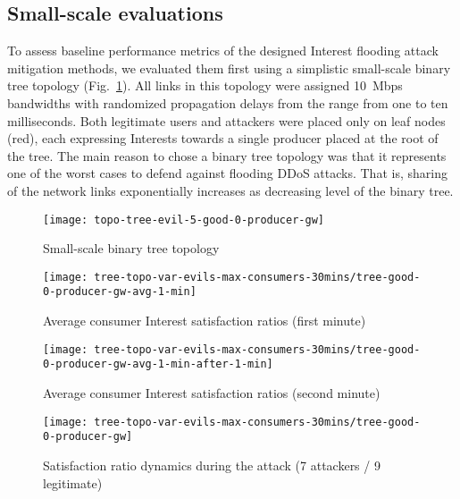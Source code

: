 \subsection{Small-scale evaluations}
\label{sec:small-scale}

To assess baseline performance metrics of the designed Interest flooding attack mitigation methods, we evaluated them first using a simplistic small-scale binary tree topology (Fig.~\ref{fig:small-scale}).
All links in this topology were assigned 10~Mbps bandwidths with randomized propagation delays from the range from one to ten milliseconds.
Both legitimate users and attackers were placed only on leaf nodes (red), each expressing Interests towards a single producer placed at the root of the tree. 
The main reason to chose a binary tree topology was that it represents one of the worst cases to defend against flooding DDoS attacks.
That is, sharing of the network links exponentially increases as decreasing level of the binary tree.

\begin{figure}[htbp]
  \centering
  \texttt{[image: topo-tree-evil-5-good-0-producer-gw]}
  \caption{Small-scale binary tree topology}
  \label{fig:small-scale}
\end{figure}


\begin{figure}[htbp]
  \centering
  \texttt{[image: tree-topo-var-evils-max-consumers-30mins/tree-good-0-producer-gw-avg-1-min]}
  \caption{Average consumer Interest satisfaction ratios (first minute)}
  \label{fig:small-scale-topo 1}
\end{figure}


\begin{figure}[htbp]
  \centering
  \texttt{[image: tree-topo-var-evils-max-consumers-30mins/tree-good-0-producer-gw-avg-1-min-after-1-min]}
  \caption{Average consumer Interest satisfaction ratios (second minute)}
  \label{fig:small-scale-topo 2}
\end{figure}

\begin{figure*}[t]
  \centering
  \texttt{[image: tree-topo-var-evils-max-consumers-30mins/tree-good-0-producer-gw]}
  \caption{Satisfaction ratio dynamics during the attack (7 attackers / 9 legitimate)}
  \label{fig:small-scale-topo 3}
\end{figure*}



